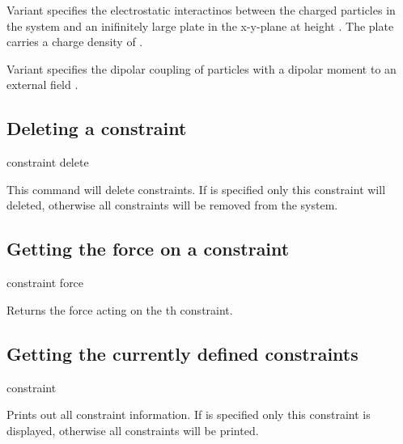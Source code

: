 Variant  specifies the electrostatic interactinos between the charged
particles in the system and an inifinitely large plate in the x-y-plane at
height . The plate carries a charge density of .
  
Variant  specifies the dipolar coupling of particles with a dipolar
moment to an external field   . 

\subsection{Deleting a constraint}
\begin{essyntax}
  constraint delete  
\end{essyntax}

This command will delete constraints. If  is specified only this
constraint will deleted, otherwise all constraints will be removed from the
system. 

\subsection{Getting the force on a constraint}
\begin{essyntax}
constraint force  
\end{essyntax}
Returns the force acting on the th constraint.


\subsection{Getting the currently defined constraints}
\begin{essyntax}
constraint   
\end{essyntax}
Prints out all constraint information. If  is specified only this
constraint is displayed, otherwise all constraints will be printed.

